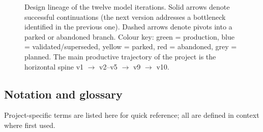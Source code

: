 \documentclass[11pt,a4paper]{article}
\begin{document}
\begin{figure}[ht]
\caption{Design lineage of the twelve model iterations.
         Solid arrows denote successful continuations (the next version
         addresses a bottleneck identified in the previous one).
         Dashed arrows denote pivots into a parked or abandoned branch.
         Colour key: green = production, blue = validated/superseded,
         yellow = parked, red = abandoned, grey = planned.
         The main productive trajectory of the project is the horizontal
         spine v1 $\rightarrow$ v2--v5 $\rightarrow$ v9 $\rightarrow$ v10.}
\label{fig:evolution}
\end{figure}

\subsection{Notation and glossary}
\label{sec:glossary}

Project-specific terms are listed here for quick reference;
all are defined in context where first used.
\end{document}
